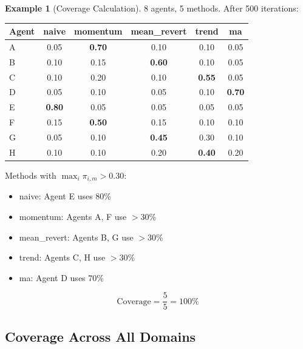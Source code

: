 \documentclass[11pt,a4paper]{article}
\theoremstyle{definition}
\newtheorem{example}{Example}[section]
\theoremstyle{plain}
\begin{document}
\begin{example}[Coverage Calculation]
8 agents, 5 methods. After 500 iterations:

\begin{center}
\begin{tabular}{l|ccccc}
\toprule
Agent & naive & momentum & mean\_revert & trend & ma \\
\midrule
A & 0.05 & \textbf{0.70} & 0.10 & 0.10 & 0.05 \\
B & 0.10 & 0.15 & \textbf{0.60} & 0.10 & 0.05 \\
C & 0.10 & 0.20 & 0.10 & \textbf{0.55} & 0.05 \\
D & 0.05 & 0.10 & 0.05 & 0.10 & \textbf{0.70} \\
E & \textbf{0.80} & 0.05 & 0.05 & 0.05 & 0.05 \\
F & 0.15 & \textbf{0.50} & 0.15 & 0.10 & 0.10 \\
G & 0.05 & 0.10 & \textbf{0.45} & 0.30 & 0.10 \\
H & 0.10 & 0.10 & 0.20 & \textbf{0.40} & 0.20 \\
\bottomrule
\end{tabular}
\end{center}

Methods with $\max_i \pi_{i,m} > 0.30$:
\begin{itemize}
    \item naive: Agent E uses 80\% \checkmark
    \item momentum: Agents A, F use $>$30\% \checkmark
    \item mean\_revert: Agents B, G use $>$30\% \checkmark
    \item trend: Agents C, H use $>$30\% \checkmark
    \item ma: Agent D uses 70\% \checkmark
\end{itemize}

\begin{equation}
\text{Coverage} = \frac{5}{5} = 100\%
\end{equation}
\end{example}

\subsection{Coverage Across All Domains}
\end{document}
